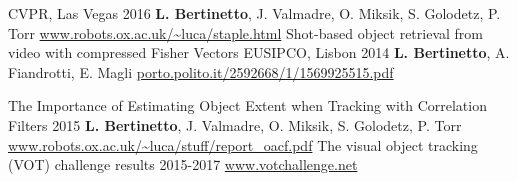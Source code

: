 \begin{cvpapers}
    {CVPR, Las Vegas} %
    {2016} %
  \cvpaperauthors
    {\textbf{L. Bertinetto}, J. Valmadre, O. Miksik, S. Golodetz, P. Torr}
    {} %
    {} %
  \cvpaperurl
    {\href{http://www.robots.ox.ac.uk/~luca/staple.html}{www.robots.ox.ac.uk/\textasciitilde luca/staple.html}}
    {} %
    {} %
  \cvpapertitle
    {Shot-based object retrieval from video with compressed Fisher Vectors} %
    {EUSIPCO, Lisbon} %
    {2014} %
  \cvpaperauthors
    {\textbf{L. Bertinetto}, A. Fiandrotti, E. Magli}
    {} %
    {} %
  \cvpaperurl
    {\href{http://porto.polito.it/2592668/1/1569925515.pdf}{porto.polito.it/2592668/1/1569925515.pdf}}
    {} %
    {} %

\end{cvpapers}


\begin{cvpapers}

  \cvpapertitle
    {The Importance of Estimating Object Extent when Tracking with Correlation Filters} %
    {} %
    {2015} %
  \cvpaperauthors
    {\textbf{L. Bertinetto}, J. Valmadre,  O. Miksik, S. Golodetz, P. Torr}
    {} %
    {} %
  \cvpaperurl
    {\href{http://www.robots.ox.ac.uk/~luca/stuff/report_oacf.pdf}{www.robots.ox.ac.uk/\textasciitilde luca/stuff/report\_oacf.pdf}}
    {} %
    {} %
  \cvpapertitle
    {The visual object tracking (VOT) challenge results} %
    {} %
    {2015-2017} %
  \cvpaperurl
    {\href{http://www.votchallenge.net}{www.votchallenge.net}}
    {} %
    {} %

\end{cvpapers}